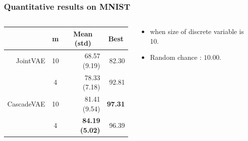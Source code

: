 \documentclass[10pt,mathserif]{beamer}
\begin{document}
\begin{frame}
\frametitle{Quantitative results on MNIST}
\begin{columns}
\begin{column}{0.5\textwidth}
\begin{table}[htbp]
\centering
\fontsize{9pt}{9.5pt}\selectfont
\begin{tabular}{rc rr}
\addlinespace[-\aboverulesep]
\toprule
\multicolumn{1}{c}{Method}&m& \multicolumn{1}{c}{Mean (std)}&\multicolumn{1}{c}{Best}\\
\toprule
JointVAE & 10&68.57 (9.19) &82.30\\
        &  4&78.33 (7.18) &92.81\\
\midrule
CascadeVAE &10&81.41 (9.54)& \textbf{97.31}\\
           & 4&\textbf{84.19 (5.02)}& 96.39\\
\bottomrule
\end{tabular}
\end{table}
\end{column}
\begin{column}{0.4\textwidth}
\begin{itemize}\itemsep=12pt
\item {\color{blue}{Unsupervised classification accuracy}} when size of discrete variable is 10.
\item Random chance : $10.00$.
\end{itemize}

\end{column}
\end{columns}
\end{frame}
\end{document}
